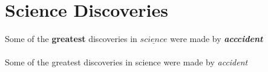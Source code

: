 \documentclass{article}
\begin{document}
	
	\section{Science Discoveries}
	Some of the \textbf{greatest}
	discoveries in $\underline{science}$
	were made by
	\textbf{\textit{acccident}}
	
	\paragraph{}
	Some of the greatest discoveries in
	science were made by \emph{accident}
	
\end{document}
